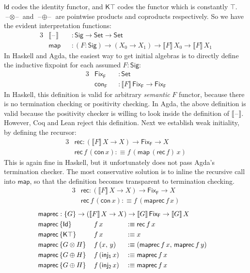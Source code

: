\documentclass[12pt,a4paper,twoside,openany]{book}
\theoremstyle{remark}
\theoremstyle{definition}
\theoremstyle{theorem}
\newcommand{\ms}[1]{\mathsf{#1}}
\newcommand{\Id}{\mathsf{Id}}
\newcommand{\blank}{\mathord{\hspace{1pt}\text{--}\hspace{1pt}}}
\newcommand{\Set}{\mathsf{Set}}
\newcommand{\defn}{:\equiv}
\begin{document}
$\ms{Id}$ codes the identity functor, and $\ms{K\top}$ codes the functor which
is constantly $\top$. $\blank\!\otimes\!\blank$ and $\blank\!\oplus\!\blank$ are
pointwise products and coproducts respectively. So we have the evident
interpretation functions:
\begin{alignat*}{3}
  & \llbracket\blank\rrbracket &&: \ms{Sig} \to \Set \to \Set\\
  & \ms{map} &&: (F : \ms{Sig}) \to (X_0 \to X_1) \to \llbracket F \rrbracket\,X_0 \to \llbracket F \rrbracket\,X_1
\end{alignat*}
In Haskell and Agda, the easiest way to get initial algebras is to directly define
the inductive fixpoint for each assumed $F : \ms{Sig}$:
\begin{alignat*}{3}
  & \ms{Fix_F} &&: \Set \\
  & \ms{con_F} &&: \llbracket F \rrbracket\,\ms{Fix_F} \to \ms{Fix_F}
\end{alignat*}
In Haskell, this definition is valid for arbitrary \emph{semantic} $F$ functor,
because there is no termination checking or positivity checking. In Agda, the
above definition is valid because the positivity checker is willing to look
inside the definition of $\llbracket\blank\rrbracket$. However, Coq and Lean
reject this definition. Next we establish weak initiality, by defining the
recursor:
\begin{alignat*}{3}
  & \ms{rec} : (\llbracket F \rrbracket\,X \to X) \to \ms{Fix_F} \to X \\
  & \ms{rec}\,f\,(\ms{con}\,x) \defn f\,(\ms{map}\,(\ms{rec}\,f)\,x)
\end{alignat*}
This is again fine in Haskell, but it unfortunately does not pass Agda's
termination checker. The most conservative solution is to inline the recursive
call into $\ms{map}$, so that the definition becomes transparent to termination
checking.
\begin{alignat*}{3}
  &\ms{rec} : (\llbracket F \rrbracket\,X \to X) \to \ms{Fix_F} \to X\\
  &\ms{rec}\,f\,(\ms{con}\,x) \defn f\,(\ms{maprec}\,f\,x)
\end{alignat*}
\begin{alignat*}{3}
  & \rlap{$\ms{maprec} : \{G\} \to (\llbracket F \rrbracket\,X \to X) \to \llbracket G \rrbracket\,\ms{Fix_F} \to \llbracket G \rrbracket\,X$}\\
  & \ms{maprec}\,\{\Id\}\,&&f\,x &&\defn \ms{rec}\,f\,x\\
  & \ms{maprec}\,\{\ms{K\top}\}\,&&f\,x &&\defn x\\
  & \ms{maprec}\,\{G \otimes H\}\,&&f\,(x,\,y) &&\defn  (\ms{maprec}\,f\,x,\,\ms{maprec}\,f\,y)\\
  & \ms{maprec}\,\{G \oplus H\}\,&&f\,(\ms{inj_1}\,x) &&\defn \ms{maprec}\,f\,x\\
  & \ms{maprec}\,\{G \oplus H\}\,&&f\,(\ms{inj_2}\,x) &&\defn \ms{maprec}\,f\,x
\end{alignat*}
\end{document}
